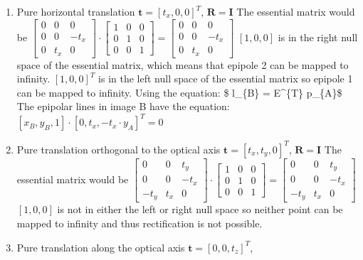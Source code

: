 \documentclass[11pt]{article}
\begin{document}
\begin{enumerate}
\def\labelenumi{\alph{enumi})}
\item
  Pure horizontal translation \(\boldsymbol{t} = [t_{x}, 0, 0]^T\),
  \(\boldsymbol{R} = \boldsymbol{I}\) The essential matrix would be
  \(\begin{bmatrix} 0 & 0 & 0 \\ 0 & 0 & -t_{x} \\ 0 & t_{x} & 0\end{bmatrix} \cdot \begin{bmatrix} 1 & 0 & 0 \\ 0 & 1 & 0 \\ 0 & 0 & 1\end{bmatrix} = \begin{bmatrix} 0 & 0 & 0 \\ 0 & 0 & -t_{x} \\ 0 & t_{x} & 0\end{bmatrix}\)
  \([1, 0, 0]\) is in the right null space of the essential matrix,
  which means that epipole 2 can be mapped to infinity. \([1, 0, 0]^T\)
  is in the left null space of the essential matrix so epipole 1 can be
  mapped to infinity. Using the equation: \$ l\_\{B\} = E\^{}\{T\}
  \cdot p\_\{A\}\$ The epipolar lines in image B have the equation:
  \([x_{B}, y_{B}, 1] \cdot [0, t_{x}, -t_{x} \cdot y_{A}]^T = 0\) 
\item
  Pure translation orthogonal to the optical axis
  \(\boldsymbol{t} = [t_{x}, t_{y}, 0]^T\),
  \(\boldsymbol{R} = \boldsymbol{I}\) The essential matrix would be
  \(\begin{bmatrix} 0 & 0 & t_{y} \\ 0 & 0 & -t_{x} \\ -t_{y} & t_{x} & 0\end{bmatrix} \cdot \begin{bmatrix} 1 & 0 & 0 \\ 0 & 1 & 0 \\ 0 & 0 & 1\end{bmatrix} = \begin{bmatrix} 0 & 0 & t_{y} \\ 0 & 0 & -t_{x} \\ -t_{y} & t_{x} & 0\end{bmatrix}\)
  \([1, 0 ,0]\) is not in either the left or right null space so neither
  point can be mapped to infinity and thus rectification is not
  possible. 
\item
  Pure translation along the optical axis
  \(\boldsymbol{t} = [0, 0, t_{z}]^T\),

\end{enumerate}
\end{document}
